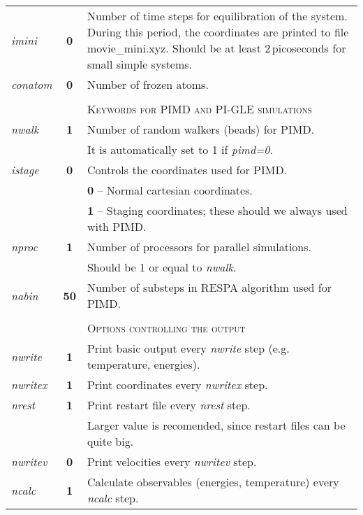 \begin{tabularx}{\textwidth}{lcX}
\textit{imini} & \textbf{0} &  Number of time steps for equilibration of the system. 
During this period, the coordinates are printed to file movie\_mini.xyz. Should be at least 2\,picoseconds for small simple systems. \\

\textit{conatom} & \textbf{0} & Number of frozen atoms. \\ 
& & \\
& & \textsc{Keywords for PIMD and PI-GLE simulations} \\
\textit{nwalk} & \textbf{1} & Number of random walkers (beads) for PIMD. \\
 & & It is automatically set to 1 if \textit{pimd=0}. \\
 
\textit{istage}  & \textbf{0} & Controls the coordinates used for PIMD.\\
 & & \textbf{0} -- Normal cartesian coordinates.  \\
 & & \textbf{1} -- Staging coordinates; these should we always used with PIMD. \\
\textit{nproc} & \textbf{1} & Number of processors for parallel simulations. \\
& & Should be 1 or equal to \textit{nwalk}. 	 \\
\colorbox{black!20}{\textit{nabin}} & \textbf{50} & Number of substeps in RESPA algorithm used for PIMD. \\
 
& & \\
& & \textsc{Options controlling the output} \\
\textit{nwrite} & \textbf{1}  & Print basic output every \textit{nwrite} step (e.g. temperature, energies).  \\
\textit{nwritex}& \textbf{1}  & Print coordinates every  \textit{nwritex} step. \\
\textit{nrest} & \textbf{1}   & Print restart file every \textit{nrest} step.   \\
& &  Larger value is recomended, since restart files can be quite big. \\
\textit{nwritev} & \textbf{0} & Print velocities every \textit{nwritev} step.   \\
\colorbox{black!20}{\textit{ncalc}} & \textbf{1}   & Calculate observables (energies, temperature) every \textit{ncalc} step. 	\\

\end{tabularx}
\newpage

